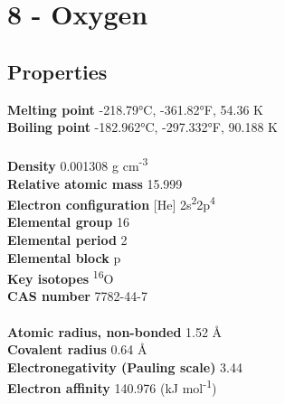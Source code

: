 \section{8 - Oxygen}
\label{sec:elem-oxygen}
\subsection{Properties}
\textbf{Melting point} -218.79°C, -361.82°F, 54.36 K\\
\textbf{Boiling point} -182.962°C, -297.332°F, 90.188 K\\
\\
\textbf{Density} 0.001308 g cm\textsuperscript{-3}\\
\textbf{Relative atomic mass} 15.999\\
\textbf{Electron configuration} [He] 2s\textsuperscript{2}2p\textsuperscript{4}\\
\textbf{Elemental group} 16\\
\textbf{Elemental period} 2\\
\textbf{Elemental block} p\\
\textbf{Key isotopes} \textsuperscript{16}O\\
\textbf{CAS number} 7782-44-7\\
\\
\textbf{Atomic radius, non-bonded} 1.52 Å\\
\textbf{Covalent radius} 0.64 Å\\
\textbf{Electronegativity (Pauling scale)} 3.44\\
\textbf{Electron affinity} 140.976 (kJ mol\textsuperscript{-1})\\